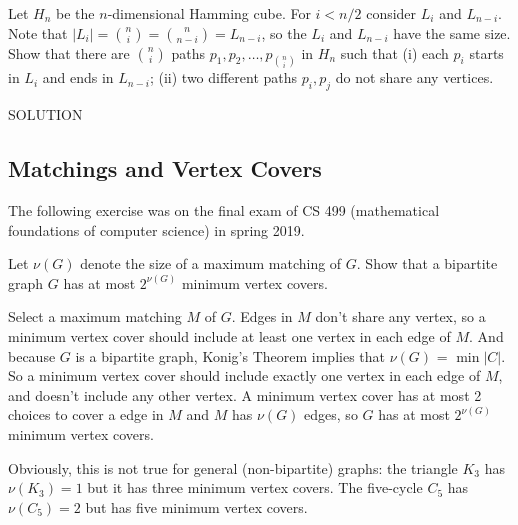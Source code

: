\documentclass[11pt,a4paper,oneside]{article}
\begin{document}
\begin{problem}{5}
	\statement
  Let $H_n$ be the $n$-dimensional Hamming cube. For $i < n/2$ consider
  $L_i$ and $L_{n-i}$. Note that 
  $|L_i| = {n \choose i} = { n \choose n-i}  = L_{n-i}$, so the 
  $L_i$ and $L_{n-i}$ have the same size.   Show that there are ${n \choose i}$ paths $p_1,p_2,\dots,p_{ {n \choose i}}$
  in $H_n$ such that
  (i) each $p_i$ starts in $L_i$ and ends in $L_{n-i}$;
  (ii) two different paths $p_i,p_j$ do not share any vertices.
  
    \solution
    SOLUTION
\end{problem}


\subsection{Matchings and Vertex Covers}

The following exercise was on the final exam of CS 499 (mathematical foundations of computer science) in spring 2019.

\begin{problem}{6}
	\statement
    Let $\nu(G)$ denote the size of a maximum matching of $G$. Show that a bipartite graph $G$
    has at most $2^{\nu(G)}$ minimum vertex covers.
    
    \solution
    Select a maximum matching $M$ of $G$. 
    Edges in $M$ don't share any vertex, so a minimum vertex cover should include at least one vertex in each edge of $M$. 
	And because $G$ is a bipartite graph, Konig's Theorem implies that $\nu(G)$ = $\min|C|$. 
    So a minimum vertex cover should include exactly one vertex in each edge of $M$, and doesn't include any other vertex. 
    A minimum vertex cover has at most 2 choices to cover a edge in $M$ and $M$ has $\nu(G)$ edges, 
    so $G$ has at most $2^{\nu(G)}$ minimum vertex covers. 
\end{problem}

Obviously, this is not  true for general (non-bipartite) graphs: the triangle $K_3$ has $\nu(K_3) = 1$ but it has 
three minimum vertex covers. The five-cycle $C_5$ has $\nu(C_5) = 2$ but has five minimum vertex covers.
\end{document}
